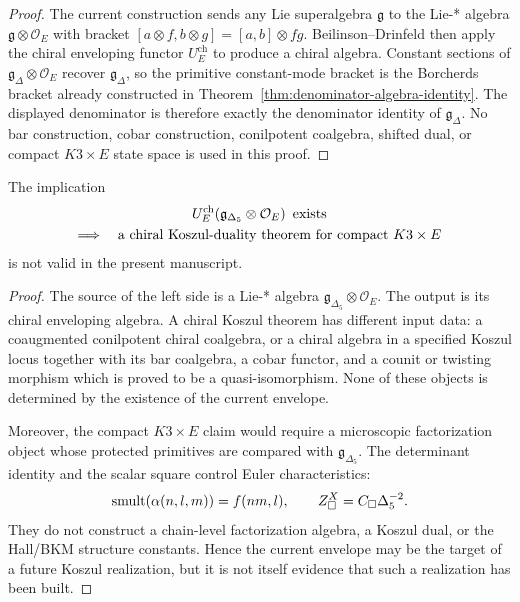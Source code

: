 \begin{proof}
The current construction sends any Lie superalgebra \(\mathfrak g\) to the
Lie-* algebra \(\mathfrak g\otimes\mathcal O_E\) with bracket
\([a\otimes f,b\otimes g]=[a,b]\otimes fg\).  Beilinson--Drinfeld then
apply the chiral enveloping functor \(U_E^{\mathrm{ch}}\) to produce a
chiral algebra.  Constant sections of
\(\mathfrak g_\Delta\otimes\mathcal O_E\) recover \(\mathfrak g_\Delta\),
so the primitive constant-mode bracket is the Borcherds bracket already
constructed in Theorem~\ref{thm:denominator-algebra-identity}.  The displayed
denominator is therefore exactly the denominator identity of
\(\mathfrak g_\Delta\).  No bar construction, cobar construction,
conilpotent coalgebra, shifted dual, or compact \(K3\times E\) state space
is used in this proof.
\end{proof}

\begin{proposition}
\label{prop:no-automatic-koszul}
The implication
$$
\begin{gathered}
U_E^{\mathrm{ch}}\!\left(\mathfrak g_{\Delta_5}\otimes\mathcal O_E\right)
\ \hbox{exists}\\
\Longrightarrow\quad
\hbox{a chiral Koszul-duality theorem for compact }K3\times E
\end{gathered}
$$
is not valid in the present manuscript.
\end{proposition}

\begin{proof}
The source of the left side is a Lie-* algebra
\(\mathfrak g_{\Delta_5}\otimes\mathcal O_E\).  The output is its chiral
enveloping algebra.  A chiral Koszul theorem has different input data: a
coaugmented conilpotent chiral coalgebra, or a chiral algebra in a
specified Koszul locus together with its bar coalgebra, a cobar functor,
and a counit or twisting morphism which is proved to be a quasi-isomorphism.
None of these objects is determined by the existence of the current
envelope.

Moreover, the compact \(K3\times E\) claim would require a microscopic
factorization object whose protected primitives are compared with
\(\mathfrak g_{\Delta_5}\).  The determinant identity and the scalar square
control Euler characteristics:
$$
\operatorname{smult}(\alpha(n,l,m))=f(nm,l),\qquad
Z^X_\square=C_\square\Delta_5^{-2}.
$$
They do not construct a chain-level factorization algebra, a Koszul dual,
or the Hall/BKM structure constants.  Hence the current envelope may be
the target of a future Koszul realization, but it is not itself evidence
that such a realization has been built.
\end{proof}

